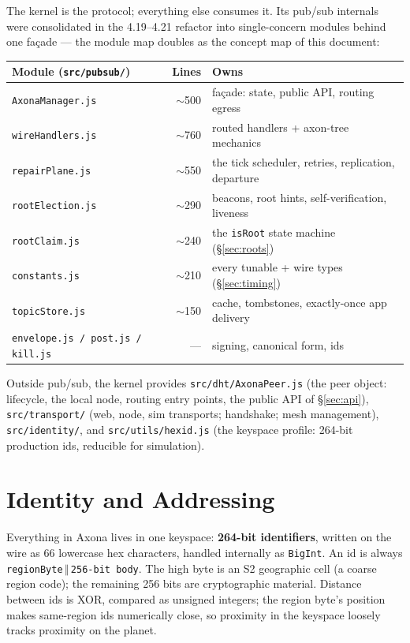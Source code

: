 \documentclass[nobib]{tufte-handout}
\begin{document}
\noindent The kernel is the protocol; everything else consumes it. Its
pub/sub internals were consolidated in the 4.19--4.21 refactor into
single-concern modules behind one fa\c{c}ade --- the module map doubles
as the concept map of this document:

\begin{table}[h]
\scriptsize
\begin{tabular}{@{}lrl@{}}
\toprule
Module (\texttt{src/pubsub/}) & Lines & Owns \\
\midrule
\texttt{AxonaManager.js} & $\sim$500 & fa\c{c}ade: state, public API, routing egress \\
\texttt{wireHandlers.js} & $\sim$760 & routed handlers + axon-tree mechanics \\
\texttt{repairPlane.js} & $\sim$550 & the tick scheduler, retries, replication, departure \\
\texttt{rootElection.js} & $\sim$290 & beacons, root hints, self-verification, liveness \\
\texttt{rootClaim.js} & $\sim$240 & the \texttt{isRoot} state machine (\S\ref{sec:roots}) \\
\texttt{constants.js} & $\sim$210 & every tunable + wire types (\S\ref{sec:timing}) \\
\texttt{topicStore.js} & $\sim$150 & cache, tombstones, exactly-once app delivery \\
\texttt{envelope.js / post.js / kill.js} & --- & signing, canonical form, ids \\
\bottomrule
\end{tabular}
\end{table}

Outside pub/sub, the kernel provides \texttt{src/dht/AxonaPeer.js} (the
peer object: lifecycle, the local node, routing entry points, the public
API of \S\ref{sec:api}), \texttt{src/transport/} (web, node, sim
transports; handshake; mesh management), \texttt{src/identity/},
and \texttt{src/utils/hexid.js} (the keyspace profile: 264-bit
production ids, reducible for simulation).

\section{Identity and Addressing}\label{sec:identity}

Everything in Axona lives in one keyspace: \textbf{264-bit identifiers},
written on the wire as 66 lowercase hex characters, handled internally as
\texttt{BigInt}. An id is always \texttt{regionByte}\,$\Vert$\,\texttt{256-bit body}. The high byte is an S2 geographic cell (a coarse region code);
the remaining 256 bits are cryptographic material. Distance between ids
is XOR, compared as unsigned integers; the region byte's position makes
same-region ids numerically close, so proximity in the keyspace loosely
tracks proximity on the planet.
\end{document}

